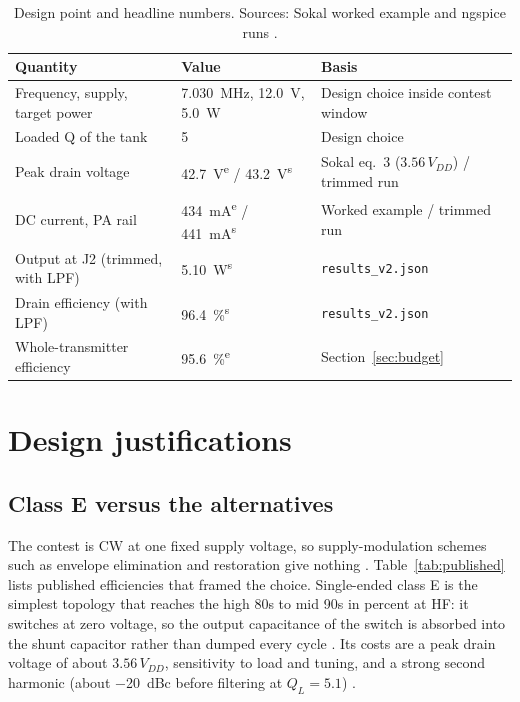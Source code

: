 \documentclass[11pt,letterpaper]{article}
\newcommand{\est}{\textsuperscript{e}}
\newcommand{\simv}{\textsuperscript{s}}
\begin{document}
\begin{table}[h]
\centering\small
\caption{Design point and headline numbers. Sources: Sokal worked example \cite{sokal2001,projnotes} and ngspice runs \cite{projsim}.}\label{tab:keynums}
\begin{tabular}{@{}lll@{}}
\toprule
Quantity & Value & Basis \\ \midrule
Frequency, supply, target power & \SI{7.030}{\mega\hertz}, \SI{12.0}{\volt}, \SI{5.0}{\watt} & Design choice inside contest window \\
Loaded Q of the tank & 5 & Design choice \cite{projnotes} \\
Peak drain voltage & \SI{42.7}{\volt}\est{} / \SI{43.2}{\volt}\simv{} & Sokal eq.~3 ($3.56\,V_{DD}$) / trimmed run \\
DC current, PA rail & \SI{434}{\milli\ampere}\est{} / \SI{441}{\milli\ampere}\simv{} & Worked example / trimmed run \\
Output at J2 (trimmed, with LPF) & \SI{5.10}{\watt}\simv{} & \texttt{results\_v2.json} \\
Drain efficiency (with LPF) & \SI{96.4}{\percent}\simv{} & \texttt{results\_v2.json} \\
Whole-transmitter efficiency & \SI{95.6}{\percent}\est{} & Section~\ref{sec:budget} \\
\bottomrule
\end{tabular}
\end{table}

\section{Design justifications}\label{sec:just}

\subsection{Class E versus the alternatives}\label{sec:classE}

The contest is CW at one fixed supply voltage, so supply-modulation schemes such as envelope elimination and restoration give nothing \cite{projnotes}. Table~\ref{tab:published} lists published efficiencies that framed the choice. Single-ended class E is the simplest topology that reaches the high 80s to mid 90s in percent at HF: it switches at zero voltage, so the output capacitance of the switch is absorbed into the shunt capacitor rather than dumped every cycle \cite{sokal2001}. Its costs are a peak drain voltage of about $3.56\,V_{DD}$, sensitivity to load and tuning, and a strong second harmonic (about \SI{-20}{dBc} before filtering at $Q_L=5.1$) \cite{sokal2001}.
\end{document}
